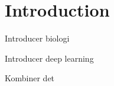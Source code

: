 \section{Introduction}\label{section:introduction}

Introducer biologi

Introducer deep learning

Kombiner det